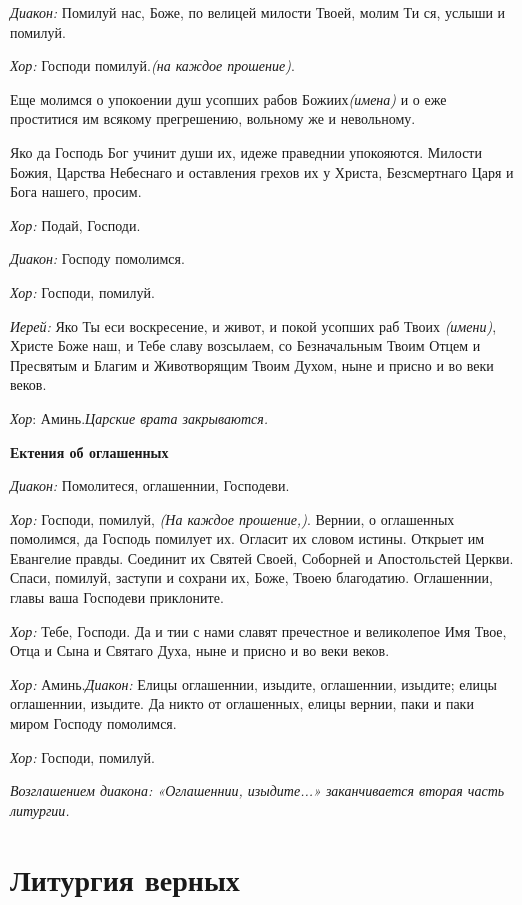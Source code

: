 {\itshape Диакон:} Помилуй нас, Боже, по велицей милости Твоей, молим Ти ся, услыши и помилуй.

{\itshape  Хор:} Господи помилуй.{\itshape  (на каждое прошение)}. 

Еще молимся о упокоении душ усопших рабов Божиих{\itshape  (имена)} и о еже проститися им всякому прегрешению, вольному же и невольному.

Яко да Господь Бог учинит души их, идеже праведнии упокояются. Милости Божия, Царства Небеснаго и оставления грехов их у Христа, Безсмертнаго Царя и Бога нашего, просим.

{\itshape Хор:} Подай, Господи.

{\itshape Диакон:} Господу помолимся.

{\itshape Хор:} Господи, помилуй.

{\itshape Иерей:} Яко Ты еси воскресение, и живот, и покой усопших раб Твоих {\itshape (имени)}, Христе Боже наш, и Тебе славу возсылаем, со Безначальным Твоим Отцем и Пресвятым и Благим и Животворящим Твоим Духом, ныне и присно и во веки веков.

{\itshape Хор}: Аминь.{\itshape  Царские врата закрываются.}

{\bfseries Ектения об оглашенных }

{\itshape Диакон:} Помолитеся, оглашеннии, Господеви.

{\itshape Хор:} Господи, помилуй, {\itshape (На каждое прошение,)}. Вернии, о оглашенных помолимся, да Господь помилует их. Огласит их словом истины. Открыет им Евангелие правды. Соединит их Святей Своей, Соборней и Апостольстей Церкви. Спаси, помилуй, заступи и сохрани их, Боже, Твоею благодатию. Оглашеннии, главы ваша Господеви приклоните.

{\itshape Хор:} Тебе, Господи. Да и тии с нами славят пречестное и великолепое Имя Твое, Отца и Сына и Святаго Духа, ныне и присно и во веки веков.

{\itshape Хор:} Аминь.{\itshape  Диакон:} Елицы оглашеннии, изыдите, оглашеннии, изыдите; елицы оглашеннии, изыдите. Да никто от оглашенных, елицы вернии, паки и паки миром Господу помолимся.

{\itshape Хор:} Господи, помилуй.

{\itshape Возглашением диакона: «Оглашеннии, изыдите...» заканчивается вторая часть литургии.}

\chapter{Литургия верных}
 
